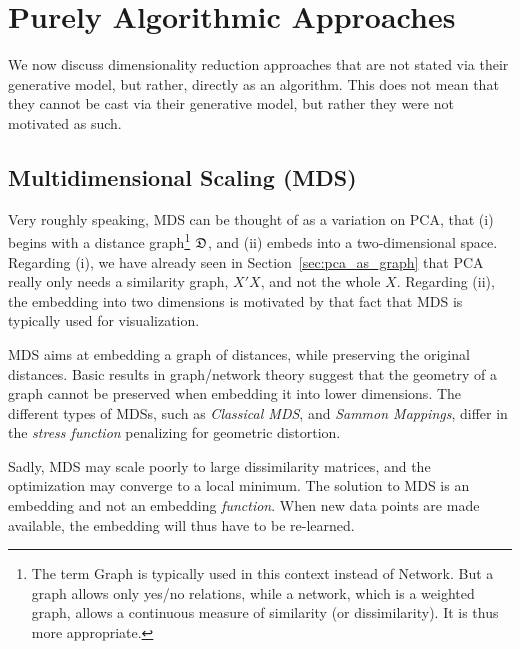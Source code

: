 \documentclass[12pt,a4paper]{article}
\begin{document}
\section{Purely Algorithmic Approaches}

We now discuss dimensionality reduction approaches that are not stated via their generative model, but rather, directly as an algorithm.
This does not mean that they cannot be cast via their generative model, but rather they were not motivated as such.



\subsection{Multidimensional Scaling (MDS)}
\label{sec:mds}

Very roughly speaking, MDS can be thought of as a variation on PCA, that (i) begins with a distance graph\footnote{The term Graph is typically used in this context instead of Network. But a graph allows only yes/no relations, while a network, which is a weighted graph, allows a continuous measure of similarity (or dissimilarity). It is thus more appropriate.} $\mathfrak{D}$, and (ii) embeds into a two-dimensional space.
Regarding (i), we have already seen in Section~\ref{sec:pca_as_graph} that PCA really only needs a similarity graph, $X'X$, and not the whole $X$.  
Regarding (ii), the embedding into two dimensions is motivated by that fact that MDS is typically used for visualization. 

MDS aims at embedding a graph of distances, while preserving the original distances.
Basic results in graph/network theory \citep[e.g.][]{graham1988isometric} suggest that the geometry of a graph cannot be preserved when embedding it into lower dimensions. 
The different types of MDSs, such as \emph{Classical MDS}, and \emph{Sammon Mappings}, differ in the \emph{stress function} penalizing for geometric distortion.

Sadly, MDS may scale poorly to large dissimilarity matrices, and the optimization may converge to a local minimum.
The solution to MDS is an embedding and not an embedding \emph{function}. 
When new data points are made available, the embedding will thus have to be re-learned.
\end{document}
